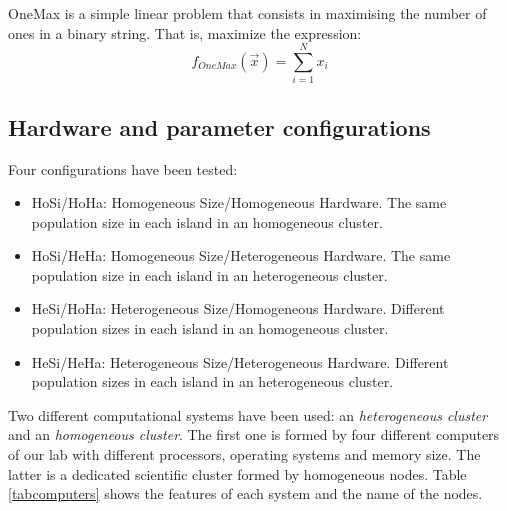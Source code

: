 \documentclass[final,1p,times]{elsarticle}
\begin{document}
OneMax is a simple linear problem that consists in maximising the number of ones in a binary string. That is, maximize the expression:
\begin{equation}
f_{OneMax}(\vec{x}) = \sum_{i=1}^{N}{x_{i}}
\end{equation}

\subsection{Hardware and parameter configurations}

Four configurations have been tested:

\begin{itemize}
\item HoSi/HoHa: Homogeneous Size/Homogeneous Hardware. The same population size in each island in an homogeneous cluster.
\item HoSi/HeHa: Homogeneous Size/Heterogeneous Hardware. The same population size in each island in an heterogeneous cluster.
\item HeSi/HoHa: Heterogeneous Size/Homogeneous Hardware. Different population sizes in each island in an homogeneous cluster.
\item HeSi/HeHa: Heterogeneous Size/Heterogeneous Hardware. Different population sizes in each island in an heterogeneous cluster.
\end{itemize}

Two different computational systems have been used: an {\em heterogeneous cluster} and an {\em homogeneous cluster}. The first one is formed by four different computers of our lab with different processors, operating systems and memory size. The latter is a dedicated scientific cluster formed by homogeneous nodes. Table \ref{tabcomputers} shows the features of each system and the name of the nodes.
\end{document}
